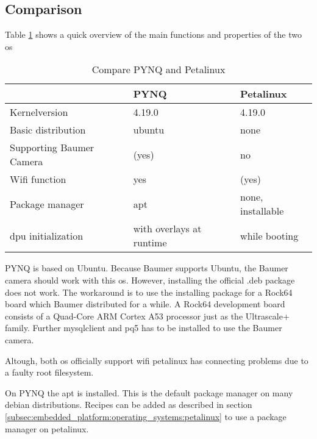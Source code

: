 \subsection{Comparison}
\label{subsec:embedded_platform:operating_systems:comparison}
Table \ref{tab:compare_os} shows a quick overview of the main functions and properties of the two \acrlong{os}

\begin{table}[hb]
  \caption{Compare PYNQ and Petalinux}
  \label{tab:compare_os}
  \centering
  \begin{tabular}{lll}
    \toprule
    \textbf{} & \textbf{PYNQ} & \textbf{Petalinux} \\
    \midrule
    Kernelversion & 4.19.0 & 4.19.0 \\ %
    Basic distribution & ubuntu & none \\ %
    Supporting Baumer Camera & (yes) & no \\ %
    Wifi function & yes & (yes) \\
    Package manager & \acrshort{apt} & none, installable \\
    dpu initialization & with overlays at runtime & while booting \\ %
    \bottomrule
  \end{tabular}
\end{table}

PYNQ is based on Ubuntu.
Because Baumer supports Ubuntu, the Baumer camera should work with this \acrlong{os}.
However, installing the official .deb package does not work.
The workaround is to use the installing package for a Rock64 board which Baumer distributed for a while.
A Rock64 development board consists of a Quad-Core ARM Cortex A53 processor just as the Ultrascale+ family.
Further mysqlclient and pq5 has to be installed to use the Baumer camera.

Altough, both \acrshort{os} officially support wifi petalinux has connecting problems due to a faulty root filesystem.

On PYNQ the \acrfull{apt} is installed.
This is the default package manager on many debian distributions.
Recipes can be added as described in section \ref{subsec:embedded_platform:operating_systems:petalinux} to use a package manager on petalinux.

